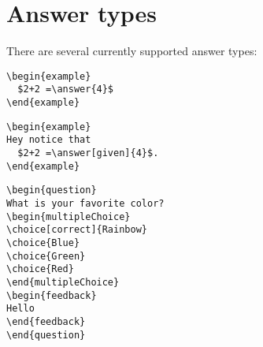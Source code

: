 \documentclass{ximera}
\begin{document}
\section{Answer types}

There are several currently supported answer types:

\begin{verbatim}
\begin{example}
  $2+2 =\answer{4}$
\end{example}
\end{verbatim}

\begin{verbatim}
\begin{example}
Hey notice that
  $2+2 =\answer[given]{4}$.
\end{example}
\end{verbatim}

\begin{verbatim}
\begin{question}
What is your favorite color?
\begin{multipleChoice}
\choice[correct]{Rainbow}
\choice{Blue}
\choice{Green}
\choice{Red}
\end{multipleChoice}
\begin{feedback}
Hello
\end{feedback}
\end{question}
\end{verbatim}
\end{document}
